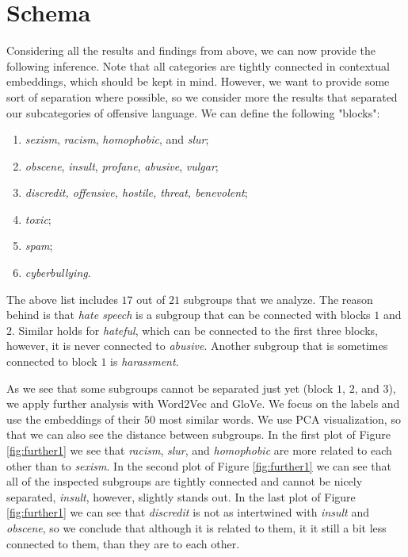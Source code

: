 \documentclass[fleqn,moreauthors,10pt]{ds_report}
\begin{document}
\section{Schema}
\label{sec:schema}
Considering all the results and findings from above, we can now provide the following inference. Note that all categories are tightly connected in contextual embeddings, which should be kept in mind. However, we want to provide some sort of separation where possible, so we consider more the results that separated our subcategories of offensive language. We can define the following "blocks":
\begin{enumerate}
  \item \textit{sexism}, \textit{racism}, \textit{homophobic}, and \textit{slur};
\vspace{-10pt} 
  \item \textit{obscene}, \textit{insult}, \textit{profane}, \textit{abusive}, \textit{vulgar};
\vspace{-10pt}
  \item \textit{discredit, offensive, hostile, threat, benevolent};
\vspace{-10pt}
  \item \textit{toxic};
\vspace{-10pt}
  \item \textit{spam};
\vspace{-10pt}
  \item \textit{cyberbullying}.
\end{enumerate}

The above list includes $17$ out of $21$ subgroups that we analyze. The reason behind is that \textit{hate speech} is a subgroup that can be connected with blocks $1$ and $2$. Similar holds for \textit{hateful}, which can be connected to the first three blocks, however, it is never connected to \textit{abusive}. Another subgroup that is sometimes connected to block $1$ is \textit{harassment}. 

As we see that some subgroups cannot be separated just yet (block $1$, $2$, and $3$), we apply further analysis with Word2Vec and GloVe. We focus on the labels and use the embeddings of their $50$ most similar words. We use PCA visualization, so that we can also see the distance between subgroups. In the first plot of Figure \ref{fig:further1} we see that \textit{racism}, \textit{slur}, and \textit{homophobic} are more related to each other than to \textit{sexism}. In the second plot of Figure \ref{fig:further1} we can see that all of the inspected subgroups are tightly connected and cannot be nicely separated, \textit{insult}, however, slightly stands out. In the last plot of Figure \ref{fig:further1} we can see that \textit{discredit} is not as intertwined with \textit{insult} and \textit{obscene}, so we conclude that although it is related to them, it it still a bit less connected to them, than they are to each other.
\end{document}
